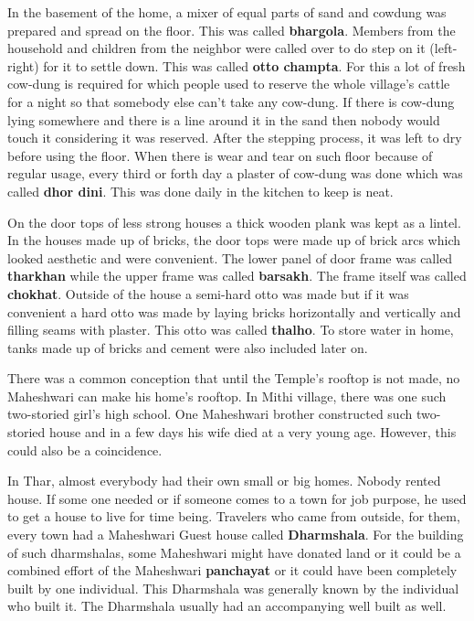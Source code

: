 In the basement of the home, a mixer of equal parts of sand and cowdung was
prepared and spread on the floor. This was called \textbf{bhargola}. Members
from the household and children from the neighbor were called over to do step on
it (left-right) for it to settle down. This was called \textbf{otto champta}.
For this a lot of fresh cow-dung is required for which people used to reserve the
whole village's cattle for a night so that somebody else can't take any
cow-dung. If there is cow-dung lying somewhere and there is a line around it in
the sand then nobody would touch it considering it was reserved. After the
stepping process, it was left to dry before using the floor. When there is wear
and tear on such floor because of regular usage, every third or forth day a
plaster of cow-dung was done which was called \textbf{dhor dini}. This was done
daily in the kitchen to keep is neat.

On the door tops of less strong houses a thick wooden plank was kept as a lintel.
In the houses made up of bricks, the door tops were made up of brick arcs which
looked aesthetic and were convenient. The lower panel of door frame was called
\textbf{tharkhan} while the upper frame was called \textbf{barsakh}. The frame
itself was called \textbf{chokhat}. Outside of the house a semi-hard otto was
made but if it was convenient a hard otto was made by laying bricks horizontally
and vertically and filling seams with plaster. This otto was called
\textbf{thalho}. To store water in home, tanks made up of bricks and cement were
also included later on.

There was a common conception that until the Temple's rooftop is not made, no
Maheshwari can make his home's rooftop. In Mithi village, there was one such
two-storied girl's high school. One Maheshwari brother constructed such
two-storied house and in a few days his wife died at a very young age. However,
this could also be a coincidence.

In Thar, almost everybody had their own small or big homes. Nobody rented house.
If some one needed or if someone comes to a town for job purpose, he used to get
a house to live for time being. Travelers who came from outside, for them, every
town had a Maheshwari Guest house called \textbf{Dharmshala}. For the building
of such dharmshalas, some Maheshwari might have donated land or it could be a
combined effort of the Maheshwari \textbf{panchayat} or it could have been
completely built by one individual. This Dharmshala was generally known by the
individual who built it. The Dharmshala usually had an accompanying well built
as well. 

